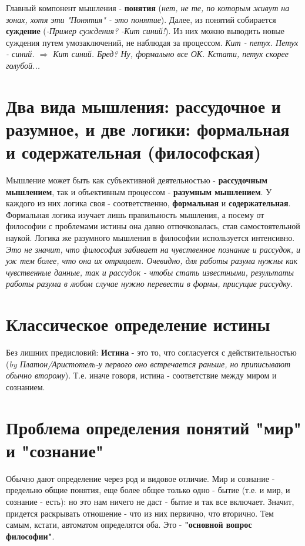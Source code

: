 Главный компонент мышления - \textbf{понятия} (\textit{нет, не те, по которым живут на зонах, хотя эти "Понятия" - это понятие}). Далее, из понятий собирается \textbf{суждение} (\textit{-Пример суждения? -Кит синий!}). Из них можно выводить новые суждения путем умозаключений, не наблюдая за процессом. \textit{Кит - петух. Петух - синий. $\Rightarrow$ Кит синий. Бред? Ну, формально все ОК. Кстати, петух скорее голубой...}


\section{Два вида мышления: рассудочное и разумное, и две логики: формальная и содержательная (философская)}
Мышление может быть как субъективной деятельностью - \textbf{рассудочным мышлением},
так и объективным процессом - \textbf{разумным мышлением}. 
У каждого из них логика своя - соответственно, \textbf{формальная} и \textbf{содержательная}.
Формальная логика изучает лишь правильность мышления, а посему от философии с проблемами истины она давно отпочковалась, став самостоятельной наукой. Логика же разумного мышления в философии используется интенсивно. 
\textit{ Это не значит, что философия забивает на чувственное познание и рассудок, и уж тем более, что она их отрицает. Очевидно, для работы разума нужны как чувственные данные, так и рассудок - чтобы стать известными, результаты работы разума в любом случае нужно перевести в формы, присущие рассудку.}

\section{Классическое определение истины}
Без лишних предисловий: \textbf{Истина} - это то, что согласуется с действительностью (\textit{by Платон/Аристотель-у первого оно встречается раньше, но приписывают обычно второму}). 
Т.е. иначе говоря, истина - соответствие между миром и сознанием.

\section{Проблема определения понятий "мир" и "сознание"}
Обычно дают определение через род и видовое отличие. Мир и сознание - предельно общие понятия, еще более общее только одно - бытие (т.е. и мир, и сознание - есть): но это нам ничего не даст - бытие и так все включает. Значит, придется раскрывать отношение - что из них первично, что вторично. Тем самым, кстати, автоматом определятся оба. Это - \textbf{"основной вопрос философии"}. 

